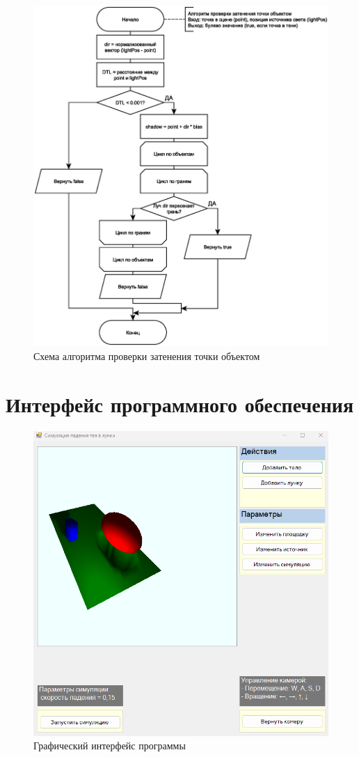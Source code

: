 \begin{figure}[h!]
    \centering
    \includegraphics[scale=0.45]{img/shadow.eps}
    \caption{Схема алгоритма проверки затенения точки объектом}
    \label{fig:shadow}
\end{figure}


\vspace{5mm}

\section{Интерфейс программного обеспечения}
\begin{figure}[h!]
    \centering
    \includegraphics[width=0.4\linewidth]{img/int-1-2.png}
    \caption{Графический интерфейс программы}
    \label{fig:int-1}
\end{figure}


